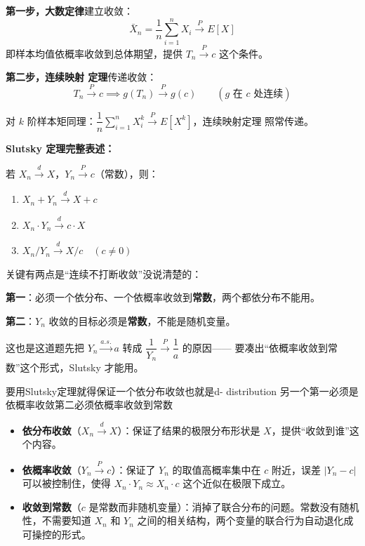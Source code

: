 \begin{dxtips}
    \textbf{第一步，大数定律}建立收敛：
$$\bar{X}_n = \frac{1}{n}\sum_{i=1}^n X_i \xrightarrow{P} E[X]$$
即样本均值依概率收敛到总体期望，提供 $T_n \xrightarrow{P} c$ 这个条件。

\textbf{第二步，连续映射 定理}传递收敛：
$$T_n \xrightarrow{P} c \implies g(T_n) \xrightarrow{P} g(c) \qquad (g \text{ 在 } c \text{ 处连续})$$

对 $k$ 阶样本矩同理：$\dfrac{1}{n}\sum_{i=1}^n X_i^k \xrightarrow{P} E[X^k]$，连续映射定理 照常传递。
\end{dxtips}
\begin{note}
    \textbf{Slutsky 定理完整表述：}

若 $X_n \xrightarrow{d} X$，$Y_n \xrightarrow{P} c$（常数），则：
\begin{enumerate}
    \item $X_n + Y_n \xrightarrow{d} X + c$
    \item $X_n \cdot Y_n \xrightarrow{d} c \cdot X$
    \item $X_n / Y_n \xrightarrow{d} X / c \quad (c \neq 0)$
\end{enumerate}

关键有两点是``连续不打断收敛''没说清楚的：

\textbf{第一}：必须一个依分布、一个依概率收敛到\textbf{常数}，两个都依分布不能用。

\textbf{第二}：$Y_n$ 收敛的目标必须是\textbf{常数}，不能是随机变量。

这也是这道题先把 $Y_n \xrightarrow{a.s.} a$ 转成 $\dfrac{1}{Y_n} \xrightarrow{P} \dfrac{1}{a}$ 的原因——
要凑出``依概率收敛到常数''这个形式，Slutsky 才能用。
\end{note}
\begin{dxtips}
    要用Slutsky定理就得保证一个依分布收敛也就是d- distribution 另一个第一必须是依概率收敛第二必须依概率收敛到常数
\end{dxtips}
\begin{note}
    \begin{itemize}
    \item \textbf{依分布收敛}（$X_n \xrightarrow{d} X$）：保证了结果的极限分布形状是 $X$，提供``收敛到谁''这个内容。
    \item \textbf{依概率收敛}（$Y_n \xrightarrow{P} c$）：保证了 $Y_n$ 的取值高概率集中在 $c$ 附近，误差 $|Y_n - c|$ 可以被控制住，使得 $X_n \cdot Y_n \approx X_n \cdot c$ 这个近似在极限下成立。
    \item \textbf{收敛到常数}（$c$ 是常数而非随机变量）：消掉了联合分布的问题。常数没有随机性，不需要知道 $X_n$ 和 $Y_n$ 之间的相关结构，两个变量的联合行为自动退化成可操控的形式。
\end{itemize}
\end{note}
